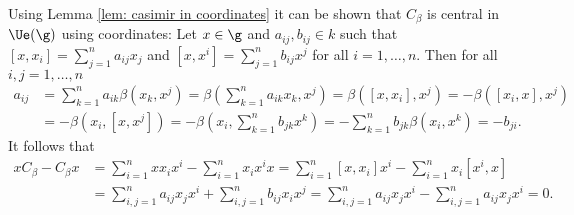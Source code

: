 \begin{remark}
 Using Lemma \ref{lem: casimir in coordinates} it can be shown that $C_\beta$ is central in $\Ue(\g)$ using coordinates: Let $x \in \g$ and $a_{ij}, b_{ij} \in k$ such that $[x,x_i] = \sum_{j=1}^n a_{ij} x_j$ and $[x,x^i] = \sum_{j=1}^n b_{ij} x^j$ for all $i = 1, \dotsc, n$. Then for all $i,j = 1, \dotsc, n$
 \begin{align*}
  a_{ij}
  &= \sum_{k=1}^n a_{ik} \beta(x_k, x^j)
  = \beta\left( \sum_{k=1}^n a_{ik} x_k, x^j \right)
  = \beta([x, x_i], x^j)
  = -\beta([x_i, x], x^j) \\
  &= -\beta(x_i, [x, x^j])
  = -\beta\left( x_i, \sum_{k=1}^n b_{jk} x^k \right)
  = -\sum_{k=1}^n b_{jk} \beta(x_i, x^k)
  = -b_{ji}.
 \end{align*}
 It follows that
 \begin{align*}
  x C_\beta - C_\beta x
  &= \sum_{i=1}^n x x_i x^i - \sum_{i=1}^n x_i x^i x
  = \sum_{i=1}^n [x, x_i] x^i - \sum_{i=1}^n x_i [x^i, x] \\
  &= \sum_{i,j=1}^n a_{ij} x_j x^i + \sum_{i,j=1}^n b_{ij} x_i x^j
  = \sum_{i,j=1}^n a_{ij} x_j x^i - \sum_{i,j=1}^n a_{ij} x_j x^i
  = 0.
 \end{align*}
\end{remark}















